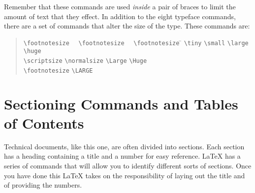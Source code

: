 Remember that these commands are used {\em inside\/} a pair of braces to limit
the amount of text that they effect.  In addition to the eight typeface
commands, there are a set of commands that alter the size of the type.  These
commands are:
\begin{quotation}\begin{tabbing}
\verb|\footnotesize|~~ \= \verb|\footnotesize|~~ \= \verb|\footnotesize| \=
 \kill
\verb|\tiny|           \> \verb|\small|          \> \verb|\large|        \>
\verb|\huge|  \\
\verb|\scriptsize|     \> \verb|\normalsize|     \> \verb|\Large|        \>
\verb|\Huge|  \\
\verb|\footnotesize|   \>                        \> \verb|\LARGE|
\end{tabbing}\end{quotation}

\section{Sectioning Commands and Tables of Contents}

Technical documents, like this one, are often divided into sections.
Each section has a heading containing a title and a number for easy
reference.  \LaTeX{} has a series of commands that will allow you to identify
different sorts of sections.  Once you have done this \LaTeX{} takes on the
responsibility of laying out the title and of providing the numbers.

